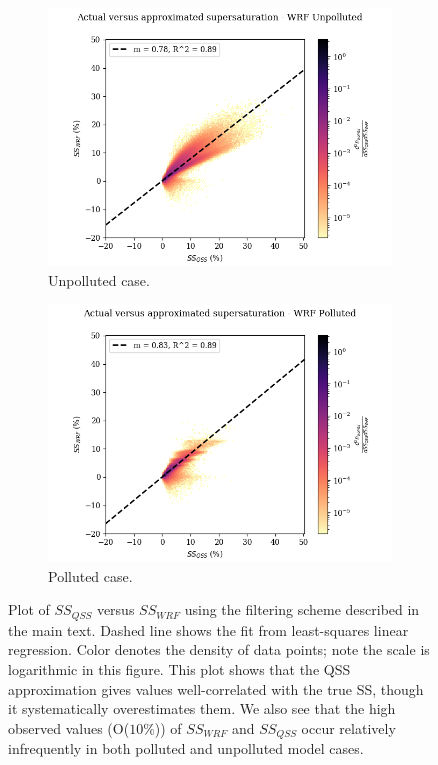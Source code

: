 \documentclass{article}
\begin{document}
\begin{figure}[ht]
	\centering
	\begin{subfigure}{0.7\textwidth}
		\includegraphics[width=\textwidth]{revmywrf/v10_FINAL_heatmap_ss_qss_vs_ss_wrf_Unpolluted_figure.png}
		\caption{Unpolluted case.}
		\label{wrfvsqssunpoll}
	\end{subfigure}
	\begin{subfigure}{0.7\textwidth}
		\includegraphics[width=\textwidth]{revmywrf/v10_FINAL_heatmap_ss_qss_vs_ss_wrf_Polluted_figure.png}
		\caption{Polluted case.}
		\label{wrfvsqsspoll}
	\end{subfigure}
	\caption{Plot of $SS_{QSS}$ versus $SS_{WRF}$ using the filtering scheme described in the main text. Dashed line shows the fit from least-squares linear regression. Color denotes the density of data points; note the scale is logarithmic in this figure. This plot shows that the QSS approximation gives values well-correlated with the true SS, though it systematically overestimates them. We also see that the high observed values (O($10\%$)) of $SS_{WRF}$ and $SS_{QSS}$ occur relatively infrequently in both polluted and unpolluted model cases.}
	\label{wrfvsqss}
\end{figure}
\end{document}

